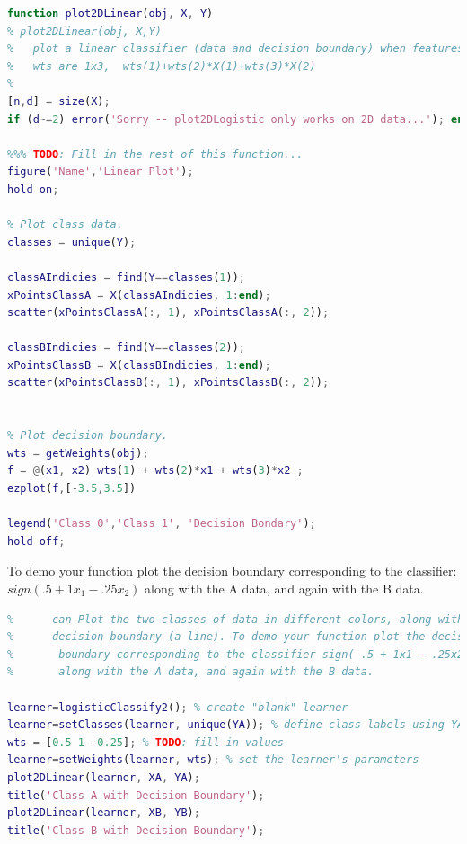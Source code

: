 \documentclass[]{report}   %
\begin{document}
\begin{lstlisting}[language=Matlab, caption=plot2DLinear() Implementation]
function plot2DLinear(obj, X, Y)
% plot2DLinear(obj, X,Y)
%   plot a linear classifier (data and decision boundary) when features X are 2-dim
%   wts are 1x3,  wts(1)+wts(2)*X(1)+wts(3)*X(2)
%
[n,d] = size(X);
if (d~=2) error('Sorry -- plot2DLogistic only works on 2D data...'); end;

%%% TODO: Fill in the rest of this function...
figure('Name','Linear Plot');
hold on;

% Plot class data.
classes = unique(Y);

classAIndicies = find(Y==classes(1));
xPointsClassA = X(classAIndicies, 1:end);
scatter(xPointsClassA(:, 1), xPointsClassA(:, 2));

classBIndicies = find(Y==classes(2));
xPointsClassB = X(classBIndicies, 1:end);
scatter(xPointsClassB(:, 1), xPointsClassB(:, 2));


% Plot decision boundary.
wts = getWeights(obj);
f = @(x1, x2) wts(1) + wts(2)*x1 + wts(3)*x2 ;
ezplot(f,[-3.5,3.5])

legend('Class 0','Class 1', 'Decision Bondary');
hold off;
\end{lstlisting}
{To demo your function plot the decision boundary corresponding to the classifier: $sign( .5 + 1x_{1} − .25x_{2} )$ along with the A data, and again with the B data.}
\begin{lstlisting}[language=Matlab, caption=Demoing plot2DLinear()]
%% (B) Write the function @logisticClassify2/plot2DLinear.m such that it 
%      can Plot the two classes of data in different colors, along with the 
%      decision boundary (a line). To demo your function plot the decision 
%       boundary corresponding to the classifier sign( .5 + 1x1 − .25x2 )
%       along with the A data, and again with the B data.

learner=logisticClassify2(); % create "blank" learner
learner=setClasses(learner, unique(YA)); % define class labels using YA or YB
wts = [0.5 1 -0.25]; % TODO: fill in values
learner=setWeights(learner, wts); % set the learner's parameters
plot2DLinear(learner, XA, YA);
title('Class A with Decision Boundary');
plot2DLinear(learner, XB, YB);
title('Class B with Decision Boundary');
\end{lstlisting}
\end{document}
